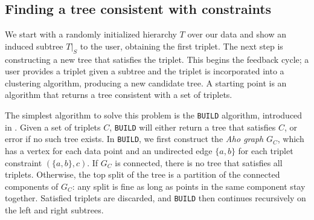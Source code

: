 %


\subsection{Finding a tree consistent with constraints}
\label{sec:aho}
We start with a randomly initialized hierarchy $T$
over our data
and show an induced subtree $T|_S$ to the user, obtaining the
first triplet. The next step is constructing  
a new tree that satisfies the triplet.
This begins the feedback cycle; a user provides a triplet
given a subtree and the triplet is incorporated into a clustering algorithm,
producing a new candidate tree.
A starting point is 
an algorithm that returns 
a tree consistent with a set of triplets.

The simplest algorithm to solve this problem is
the \texttt{BUILD} algorithm, introduced in \citet{ASSU81}.
Given a set of triplets $C$, \texttt{BUILD}
will either return a tree that satisfies $C$, or error 
if no such tree exists.
In \texttt{BUILD}, we first construct the {\it Aho graph}
$G_C$, which has a vertex for each data point and an 
undirected edge $\{a,b\}$ for each triplet constraint $(\{a,b\},c)$.
If $G_C$ is connected, there is no tree that satisfies all
triplets. Otherwise, the top split of the tree is a partition of 
the connected components of $G_C$: any split is fine as long as 
points in the same component stay together. Satisfied triplets are discarded, and \texttt{BUILD} then continues recursively on the
left and right subtrees.

